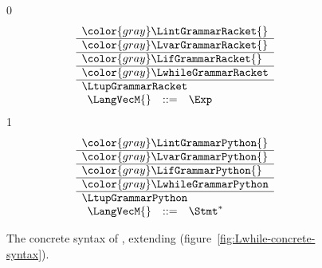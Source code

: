 \documentclass[7x10]{TimesAPriori_MIT}%
\newcommand{\gray}[1]{{\color{gray} #1}}
\def\racketEd{0}
\def\pythonEd{1}
\def\edition{1}
\newcommand{\pythonColor}[0]{}
\numberwithin{theorem}{chapter}
\numberwithin{definition}{chapter}
\numberwithin{equation}{chapter}
\begin{document}
  
\begin{figure}[tbp]
\centering
\begin{tcolorbox}[colback=white]    
    \small
{\if\edition\racketEd    
\[
\begin{array}{l}
  \gray{\LintGrammarRacket{}} \\ \hline
  \gray{\LvarGrammarRacket{}} \\ \hline
  \gray{\LifGrammarRacket{}} \\ \hline
  \gray{\LwhileGrammarRacket} \\ \hline
  \LtupGrammarRacket \\  
  \begin{array}{lcl}
    \LangVecM{} &::=& \Exp
  \end{array}
\end{array}
\]
\fi}
{\if\edition\pythonEd\pythonColor
\[
\begin{array}{l}
  \gray{\LintGrammarPython{}} \\ \hline
  \gray{\LvarGrammarPython{}} \\ \hline
  \gray{\LifGrammarPython{}} \\ \hline
  \gray{\LwhileGrammarPython} \\ \hline
  \LtupGrammarPython \\  
\begin{array}{rcl}
  \LangVecM{} &::=& \Stmt^{*}
\end{array}
\end{array}
\]
\fi}
\end{tcolorbox}
\caption{The concrete syntax of \LangVec{}, extending \LangLoop{}
  (figure~\ref{fig:Lwhile-concrete-syntax}).}
\label{fig:Lvec-concrete-syntax}
\end{figure}
\end{document}
